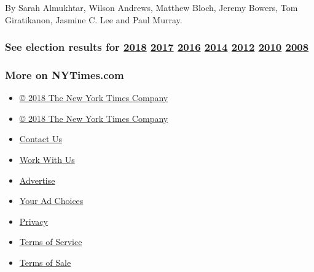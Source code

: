 By Sarah Almukhtar, Wilson Andrews, Matthew Bloch, Jeremy Bowers, Tom
Giratikanon, Jasmine C. Lee and Paul Murray.

\hypertarget{see-election-results-for-2018-2017-2016-2014-2012-2010-2008}{%
\subsubsection{\texorpdfstring{See election results for
\href{https://www.nytimes3xbfgragh.onion/interactive/2018/us/elections/calendar-primary-results.html}{2018}
\href{https://www.nytimes3xbfgragh.onion/interactive/2017/us/elections/election-calendar.html}{2017}
\href{https://www.nytimes3xbfgragh.onion/elections/results/president}{2016}
\href{https://www.nytimes3xbfgragh.onion/elections/2014/results/senate}{2014}
\href{https://www.nytimes3xbfgragh.onion/elections/2012/results/president.html}{2012}
\href{https://www.nytimes3xbfgragh.onion/elections/2010/results/senate.html}{2010}
\href{https://www.nytimes3xbfgragh.onion/elections/2008/results/president/map.html}{2008}}{See election results for 2018 2017 2016 2014 2012 2010 2008}}\label{see-election-results-for-2018-2017-2016-2014-2012-2010-2008}}

\hypertarget{more-on-nytimescom}{%
\subsubsection{More on NYTimes.com}\label{more-on-nytimescom}}

\begin{itemize}
\tightlist
\item
  \href{http://www.nytco.com}{© 2018 The New York Times Company}
\end{itemize}

\begin{itemize}
\tightlist
\item
  \href{http://www.nytco.com}{© 2018 The New York Times Company}
\item
  \href{http://www.nytimes3xbfgragh.onion/ref/membercenter/help/infoservdirectory.html}{Contact
  Us}
\item
  \href{http://www.nytco.com/careers}{Work With Us}
\item
  \href{http://www.nytimes.whsites.net/mediakit}{Advertise}
\item
  \href{http://www.nytimes3xbfgragh.onion/content/help/rights/privacy/policy/privacy-policy.html\#pp}{Your
  Ad Choices}
\item
  \href{http://www.nytimes3xbfgragh.onion/privacy}{Privacy}
\item
  \href{http://www.nytimes3xbfgragh.onion/ref/membercenter/help/agree.html}{Terms
  of Service}
\item
  \href{http://www.nytimes3xbfgragh.onion/content/help/rights/sale/terms-of-sale.html}{Terms
  of Sale}
\end{itemize}


